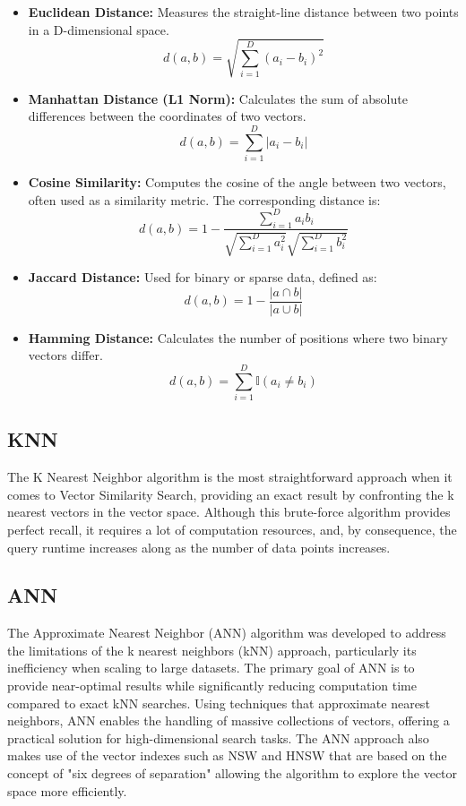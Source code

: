 \begin{itemize}
    \item \textbf{Euclidean Distance:} Measures the straight-line distance between two points in a D-dimensional space.
    \[
    d(a, b) = \sqrt{\sum_{i=1}^{D} (a_i - b_i)^2}
    \]
    \item \textbf{Manhattan Distance (L1 Norm):} Calculates the sum of absolute differences between the coordinates of two vectors.
    \[
    d(a, b) = \sum_{i=1}^{D} |a_i - b_i|
    \]
    \item \textbf{Cosine Similarity:} Computes the cosine of the angle between two vectors, often used as a similarity metric. The corresponding distance is:
    \[
    d(a, b) = 1 - \frac{\sum_{i=1}^{D} a_i b_i}{\sqrt{\sum_{i=1}^{D} a_i^2} \sqrt{\sum_{i=1}^{D} b_i^2}}
    \]
    \item \textbf{Jaccard Distance:} Used for binary or sparse data, defined as:
    \[
    d(a, b) = 1 - \frac{|a \cap b|}{|a \cup b|}
    \]
    \item \textbf{Hamming Distance:} Calculates the number of positions where two binary vectors differ.
    \[
    d(a, b) = \sum_{i=1}^{D} \mathbb{I}(a_i \neq b_i)
    \]
\end{itemize}
\subsection{KNN}
The K Nearest Neighbor algorithm is the most straightforward approach when it comes to Vector Similarity Search, providing an exact result by confronting the k nearest vectors in the vector space. Although this brute-force algorithm provides perfect recall, it requires a lot of computation resources, and, by consequence, the query runtime increases along as the number of data points increases. 
\subsection{ANN}
The Approximate Nearest Neighbor (ANN) algorithm was developed to address the limitations of the k nearest neighbors (kNN) approach, particularly its inefficiency when scaling to large datasets. The primary goal of ANN is to provide near-optimal results while significantly reducing computation time compared to exact kNN searches. Using techniques that approximate nearest neighbors, ANN enables the handling of massive collections of vectors, offering a practical solution for high-dimensional search tasks. The ANN approach also makes use of the vector indexes such as NSW and HNSW that are based on the concept of "six degrees of separation" allowing the algorithm to explore the vector space more efficiently.

